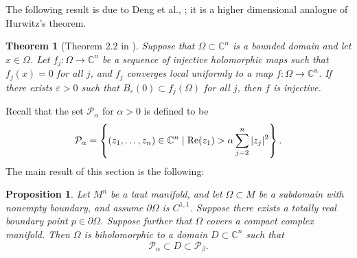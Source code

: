 \documentclass[12pt]{article}
\newcommand{\C}{\mathbb{C}}
\newcommand{\re}{\textup{Re}}
\newtheorem{theorem}[lemma]{Theorem}
\newtheorem{proposition}[lemma]{Proposition}
\begin{document}
The following result is due to Deng et al., \cite{DGZ}; it is a higher dimensional analogue of Hurwitz's theorem.

\begin{theorem}[Theorem 2.2 in \cite{DGZ}]
\label{ZimThm2.6}
Suppose that $\Omega\subset\C^n$ is a bounded domain and let $x\in\Omega$. Let $f_j:\Omega\to\C^n$ be a sequence of injective holomorphic maps such that $f_j(x)=0$ for all $j$, and $f_j$ converges local uniformly to a map $f:\Omega\to\C^n$. If there exists $\varepsilon>0$ such that $B_{\varepsilon}(0)\subset f_j(\Omega)$ for all $j$, then $f$ is injective.
\end{theorem}

Recall that the set $\mathcal{P}_{\alpha}$ for $\alpha>0$ is defined to be
$$\mathcal{P}_{\alpha}=\left\{(z_1,\dots,z_n)\in\C^n\mid\re(z_1)>\alpha\sum_{j=2}^{n}|z_j|^2\right\}.$$
The main result of this section is the following:

\begin{proposition}
\label{MRProof1}
Let $M^n$ be a taut manifold, and let $\Omega\subset M$ be a subdomain with nonempty boundary, and assume $\partial\Omega$ is $C^{1,1}$. Suppose there exists a totally real boundary point $p\in\partial\Omega$. Suppose further that $\Omega$ covers a compact complex manifold. Then $\Omega$ is biholomorphic to a domain $D\subset\C^n$ such that
$$\mathcal{P}_{\alpha}\subset D\subset\mathcal{P}_{\beta}.$$
\end{proposition}
\end{document}
